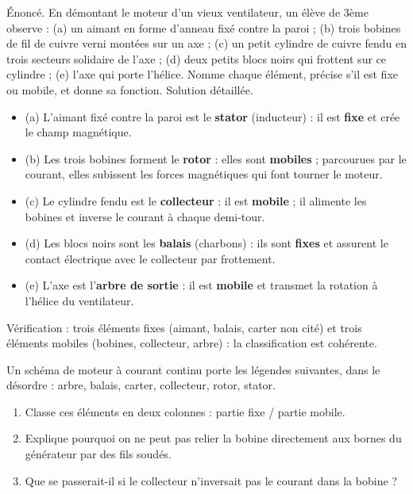 \documentclass[11pt]{article}
\begin{document}
\begin{exoresolu}
Énoncé. En démontant le moteur d'un vieux ventilateur, un élève de 3ème observe : (a) un aimant en forme d'anneau fixé contre la paroi ; (b) trois bobines de fil de cuivre verni montées sur un axe ; (c) un petit cylindre de cuivre fendu en trois secteurs solidaire de l'axe ; (d) deux petits blocs noirs qui frottent sur ce cylindre ; (e) l'axe qui porte l'hélice. Nomme chaque élément, précise s'il est fixe ou mobile, et donne sa fonction.
\tcblower
Solution détaillée.
\begin{itemize}
\item (a) L'aimant fixé contre la paroi est le \textbf{stator} (inducteur) : il est \textbf{fixe} et crée le champ magnétique.
\item (b) Les trois bobines forment le \textbf{rotor} : elles sont \textbf{mobiles} ; parcourues par le courant, elles subissent les forces magnétiques qui font tourner le moteur.
\item (c) Le cylindre fendu est le \textbf{collecteur} : il est \textbf{mobile} ; il alimente les bobines et inverse le courant à chaque demi-tour.
\item (d) Les blocs noirs sont les \textbf{balais} (charbons) : ils sont \textbf{fixes} et assurent le contact électrique avec le collecteur par frottement.
\item (e) L'axe est l'\textbf{arbre de sortie} : il est \textbf{mobile} et transmet la rotation à l'hélice du ventilateur.
\end{itemize}
Vérification : trois éléments fixes (aimant, balais, carter non cité) et trois éléments mobiles (bobines, collecteur, arbre) : la classification est cohérente.
\end{exoresolu}

\begin{exercice}
Un schéma de moteur à courant continu porte les légendes suivantes, dans le désordre : arbre, balais, carter, collecteur, rotor, stator.
\begin{enumerate}
\item Classe ces éléments en deux colonnes : partie fixe / partie mobile.
\item Explique pourquoi on ne peut pas relier la bobine directement aux bornes du générateur par des fils soudés.
\item Que se passerait-il si le collecteur n'inversait pas le courant dans la bobine ?
\end{enumerate}
\end{exercice}
\end{document}
